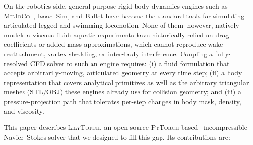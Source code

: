 \documentclass[journal,twoside,10pt]{IEEEtran}
\newcommand{\lilytorch}{\textsc{LilyTorch}\xspace}
\newcommand{\mujoco}{\textsc{MuJoCo}\xspace}
\newcommand{\pytorch}{\textsc{PyTorch}\xspace}
\begin{document}
On the robotics side, general-purpose rigid-body dynamics engines such
as \mujoco~\cite{todorov2012mujoco}, Isaac~Sim, and Bullet have become
the standard tools for simulating articulated legged and swimming
locomotion.  None of them, however, natively models a viscous fluid:
aquatic experiments have historically relied on drag coefficients or
added-mass approximations, which cannot reproduce wake reattachment,
vortex shedding, or inter-body interference.  Coupling a
fully-resolved CFD solver to such an engine requires:
(i) a fluid formulation that accepts arbitrarily-moving, articulated
geometry at every time step;
(ii) a body representation that covers analytical primitives as well
as the arbitrary triangular meshes (STL/OBJ) these engines already use
for collision geometry; and
(iii) a pressure-projection path that tolerates per-step changes in
body mask, density, and viscosity.

This paper describes \lilytorch, an open-source
\pytorch-based~\cite{paszke2019pytorch} incompressible Navier--Stokes
solver that we designed to fill this gap.  Its contributions are:
\end{document}
